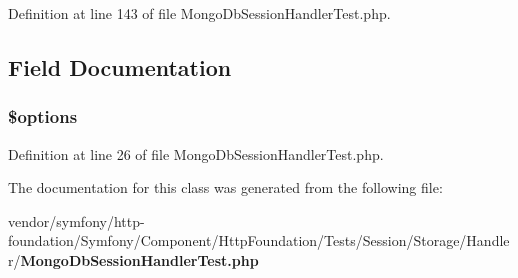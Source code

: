 Definition at line 143 of file Mongo\+Db\+Session\+Handler\+Test.\+php.



\subsection{Field Documentation}
\subsubsection[{\$options}]{\setlength{\rightskip}{0pt plus 5cm}\${\bf options}}\label{class_symfony_1_1_component_1_1_http_foundation_1_1_tests_1_1_session_1_1_storage_1_1_handler_1_1_mongo_db_session_handler_test_a011800c63ece4cbbfa77136a20607023}


Definition at line 26 of file Mongo\+Db\+Session\+Handler\+Test.\+php.



The documentation for this class was generated from the following file\+:\begin{DoxyCompactItemize}
\item 
vendor/symfony/http-\/foundation/\+Symfony/\+Component/\+Http\+Foundation/\+Tests/\+Session/\+Storage/\+Handler/{\bf Mongo\+Db\+Session\+Handler\+Test.\+php}\end{DoxyCompactItemize}
